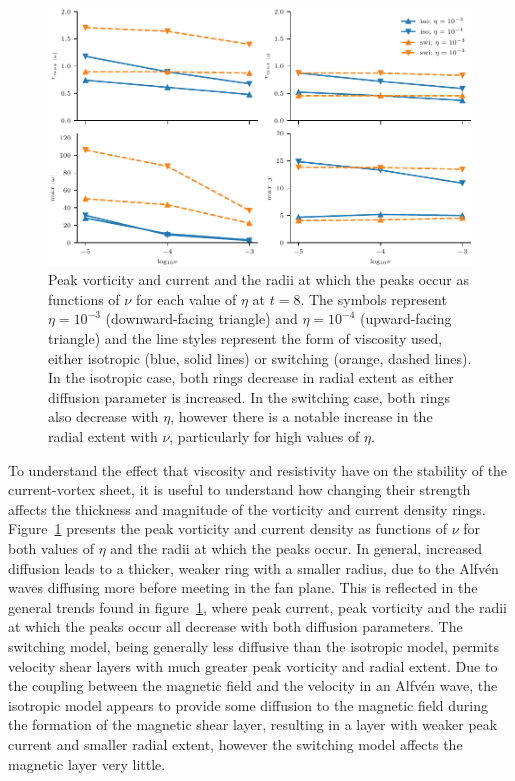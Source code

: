 \begin{figure}[h]
  \centering
  \includegraphics[width=\linewidth]{param_study/peak_mag_and_loc.pdf}
  \caption{Peak vorticity and current and the radii at which the peaks occur as functions of $\nu$ for each value of $\eta$ at $t=8$. The symbols represent $\eta=10^{-3}$ (downward-facing triangle) and $\eta=10^{-4}$ (upward-facing triangle) and the line styles represent the form of viscosity used, either isotropic (blue, solid lines) or switching (orange, dashed lines). In the isotropic case, both rings decrease in radial extent as either diffusion parameter is increased. In the switching case, both rings also decrease with $\eta$, however there is a notable increase in the radial extent with $\nu$, particularly for high values of $\eta$.}%
  \label{fig:param_study_peak_mag_and_loc}
\end{figure}


To understand the effect that viscosity and resistivity have on the stability of the current-vortex sheet, it is useful to understand how changing their strength affects the thickness and magnitude of the vorticity and current density rings. Figure~\ref{fig:param_study_peak_mag_and_loc} presents the peak vorticity and current density as functions of $\nu$ for both values of $\eta$ and the radii at which the peaks occur. In general, increased diffusion leads to a thicker, weaker ring with a smaller radius, due to the Alfv\'en waves diffusing more before meeting in the fan plane. This is reflected in the general trends found in figure~\ref{fig:param_study_peak_mag_and_loc}, where peak current, peak vorticity and the radii at which the peaks occur all decrease with both diffusion parameters. The switching model, being generally less diffusive than the isotropic model, permits velocity shear layers with much greater peak vorticity and radial extent. Due to the coupling between the magnetic field and the velocity in an Alfv\'en wave, the isotropic model appears to provide some diffusion to the magnetic field during the formation of the magnetic shear layer, resulting in a layer with weaker peak current and smaller radial extent, however the switching model affects the magnetic layer very little.

